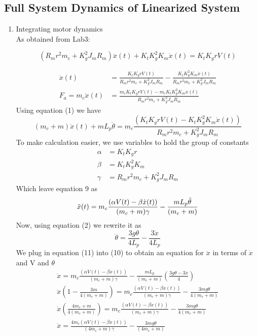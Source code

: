 \documentclass[11pt, twoside, letterpaper]{article}   	%
\begin{document}
\subsection{Full System Dynamics of Linearized System}
\begin{enumerate}
\item Integrating motor dynamics\\
As obtained from Lab3:

\begin{equation}
(R_mr^2m_c+K_g^2J_mR_m)\ddot{x}(t)+K_tK_g^2K_m\dot{x}(t)=K_tK_grV(t)
\end{equation}

\begin{align*}
\ddot{x}(t) &= \frac{K_tK_grV(t)}{R_mr^2m_c+K_g^2J_mR_m}-\frac{K_tK_g^2K_m\dot{x}(t)}{R_mr^2m_c+K_g^2J_mR_m}\\
F_a=m_c\ddot{x}(t) &= \frac{m_cK_tK_grV(t)-m_cK_tK_g^2K_m\dot{x}(t)}{R_mr^2m_c+K_g^2J_mR_m}
\end{align*}
Using equation (1) we have\\
\begin{equation}
(m_c+m)\ddot{x}(t) +mL_p\ddot{\theta} = m_c\frac{(K_tK_grV(t)-K_tK_g^2K_m\dot{x}(t))}{R_mr^2m_c+K_g^2J_mR_m}
\end{equation}
To make calculation easier, we use variables to hold the group of constants\\
\begin{align*}
\alpha &= K_tK_gr\\
\beta &=K_tK_g^2K_m\\
\gamma &= R_mr^2m_c+K_g^2J_mR_m
\end{align*}
Which leave equation 9 as\\
\begin{equation}
\ddot{x}(t) = m_c\frac{(\alpha V(t)-\beta \dot{x}(t))}{(m_c+m)\gamma}-\frac{mL_p\ddot{\theta}}{(m_c+m)}\\
\end{equation}
Now, using equation (2) we rewrite it as 
\begin{equation}
\ddot{\theta} = \frac{3g\theta}{4L_p}-\frac{3\ddot{x}}{4L_p}
\end{equation}
We plug in equation (11) into (10) to obtain an equation for
$\ddot{x}$ in terms of $\dot{x}$ and V and $\theta$
\begin{align*}
\ddot{x} = m_c\frac{(\alpha V(t)-\beta \dot{x}(t))}{(m_c+m)\gamma}-\frac{mL_p}{(m_c+m)}(\frac{3g\theta-3\ddot{x}}{4})\\
\ddot{x}(1-\frac{3m}{4(m_c+m)}) = m_c\frac{(\alpha V(t)-\beta \dot{x}(t))}{(m_c+m)\gamma}-\frac{3mg\theta}{4(m_c+m)}\\
\ddot{x}(\frac{4m_c+m}{4(m_c+m)}) = m_c\frac{(\alpha V(t)-\beta \dot{x}(t))}{(m_c+m)\gamma}-\frac{3mg\theta}{4(m_c+m)}\\
\ddot{x} = \frac{4m_c(\alpha V(t)-\beta \dot{x}(t))}{(4m_c+m)\gamma}-\frac{3mg\theta}{(4m_c+m)}
\end{align*}


\end{enumerate}
\end{document}
